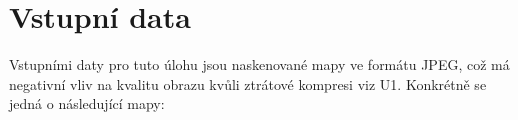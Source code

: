 \section{Vstupní data}

Vstupními daty pro tuto úlohu jsou naskenované mapy ve formátu JPEG, což má negativní vliv na kvalitu obrazu kvůli ztrátové kompresi viz U1. Konkrétně se jedná o následující mapy:





